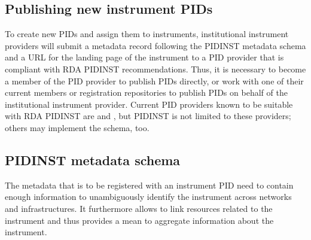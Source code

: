 \documentclass[a4paper,10pt,english]{sphinxmanual}
\begin{document}
\subsection{Publishing new instrument PIDs}
\label{\detokenize{white-paper/publishing:publishing-new-instrument-pids}}\label{\detokenize{white-paper/publishing::doc}}
To create new PIDs and assign them to instruments, institutional
instrument providers will submit a metadata record following the PIDINST
metadata schema and a URL for the landing page of the instrument to a
PID provider that is compliant with RDA PIDINST recommendations. Thus,
it is necessary to become a member of the PID provider to publish PIDs
directly, or work with one of their current members or registration
repositories to publish PIDs on behalf of the institutional instrument
provider. Current PID providers known to be suitable with RDA PIDINST
are  and , but PIDINST is not limited to these
providers; others may implement the schema, too.


\subsection{PIDINST metadata schema}
\label{\detokenize{white-paper/metadata-schema:pidinst-metadata-schema}}\label{\detokenize{white-paper/metadata-schema:id1}}\label{\detokenize{white-paper/metadata-schema::doc}}
The metadata that is to be registered with an instrument PID need to
contain enough information to unambiguously identify the
instrument across networks and infrastructures.  It furthermore allows
to link resources related to the instrument and thus provides a mean
to aggregate information about the instrument.
\end{document}
